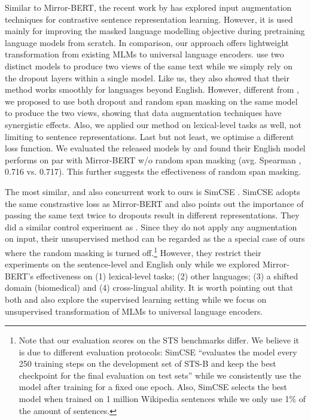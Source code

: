 \documentclass[11pt]{article}
\begin{document}
Similar to Mirror-BERT, the recent work by \citet{wu2020clear} has explored input augmentation techniques for contrastive sentence representation learning. However, it is used mainly for improving the masked language modelling objective during pretraining language models from scratch. In comparison, our approach offers lightweight transformation from existing MLMs to universal language encoders. \citep{carlsson2021semantic} use two distinct models to produce two views of the same text while we simply rely on the dropout layers within a single model. Like us, they also showed that their method works smoothly for languages beyond English. However, different from \citep{carlsson2021semantic}, we proposed to use both dropout and random span masking on the same model to produce the two views, showing that data augmentation techniques have synergistic effects. Also, we applied our method on lexical-level tasks as well, not limiting to sentence representations. Last but not least, we optimise a different loss function. We evaluated the released models by \citep{carlsson2021semantic} and found their English model performs on par with Mirror-BERT w/o random span masking (avg. Spearman , 0.716 vs. 0.717). This further suggests the effectiveness of random span masking.

The most similar, and also concurrent work to ours is SimCSE \citep{gao2021simcse}. SimCSE adopts the same constrastive loss as Mirror-BERT and also points out the importance of passing the same text twice to dropouts result in different representations. They did a similar control experiment as . Since they do not apply any augmentation on input, their unsupervised method can be regarded as the a special case of ours where the random masking is turned off.\footnote{Note that our evaluation scores on the STS benchmarks differ. We believe it is due to different evaluation protocols: SimCSE ``evaluates the
model every 250 training steps on the development
set of STS-B and keep the best checkpoint for the
final evaluation on test sets'' while we consistently use the model after training for a fixed one epoch. Also, SimCSE selects the best model when trained on 1 million Wikipedia sentences while we only use 1\% of the amount of sentences.} However, they restrict their experiments on the sentence-level and English only while we explored Mirror-BERT's effectiveness on (1) lexical-level tasks; (2) other languages; (3) a shifted domain (biomedical) and (4) cross-lingual ability. It is worth pointing out that both \citep{carlsson2021semantic} and \citep{gao2021simcse} also explore the supervised learning setting while we focus on unsupervised transformation of MLMs to universal language encoders.
\end{document}
